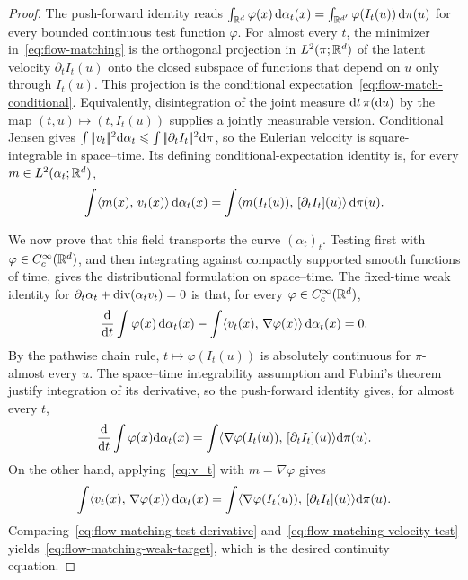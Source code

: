 \begin{proof}
	The push-forward identity reads \(\int_{\mathbb{R}^d}\varphi(x)\,\mathrm{d}\alpha_t(x)=\int_{\mathbb{R}^{d'}}\varphi(I_t(u))\,\mathrm{d}\pi(u)\) for every bounded continuous test function $\varphi$.
	For almost every $t$, the minimizer in~\eqref{eq:flow-matching} is the orthogonal projection in $L^2(\pi;\mathbb{R}^d)$ of the latent velocity $\partial_t I_t(u)$ onto the closed subspace of functions that depend on $u$ only through $I_t(u)$. This projection is the conditional expectation~\eqref{eq:flow-match-conditional}. Equivalently, disintegration of the joint measure \(\mathrm{d} t\,\pi(\mathrm{d} u)\) by the map \((t,u)\mapsto(t,I_t(u))\) supplies a jointly measurable version. Conditional Jensen gives \(\int|\!| v_t |\!|^2\mathrm{d}\alpha_t\leqslant\int|\!| \partial_t I_t |\!|^2\mathrm{d}\pi\),
	so the Eulerian velocity is square-integrable in space--time. Its defining conditional-expectation identity is, for every \(m\in L^2(\alpha_t;\mathbb{R}^d)\),
	\begin{equation}\label{eq:v_t}
		\int \langle m(x),\,v_t(x)\rangle \, \mathrm{d}\alpha_t(x)
		=
		\int \langle m(I_t(u)),\,[\partial_t I_t](u)\rangle \, \mathrm{d}\pi(u).
	\end{equation}

	We now prove that this field transports the curve $(\alpha_t)_t$. Testing first with \(\varphi\in C_c^\infty(\mathbb{R}^d)\), and then integrating against compactly supported smooth functions of time, gives the distributional formulation on space--time. The fixed-time weak identity for
	$\partial_t\alpha_t+\operatorname{div}(\alpha_t v_t)=0$ is that, for every $\varphi\in C_c^\infty(\mathbb{R}^d)$,
	\begin{equation}\label{eq:flow-matching-weak-target}
		\frac{\mathrm{d}}{\mathrm{d} t}\int\varphi(x)\,\mathrm{d}\alpha_t(x)
		-
		\int\langle v_t(x),\,\nabla\varphi(x)\rangle\,\mathrm{d}\alpha_t(x)
		=0.
	\end{equation}
	By the pathwise chain rule, $t\mapsto\varphi(I_t(u))$ is absolutely continuous for $\pi$-almost every $u$. The space--time integrability assumption and Fubini's theorem justify integration of its derivative, so the push-forward identity gives, for almost every $t$,
	\begin{equation}\label{eq:flow-matching-test-derivative}
		\frac{\mathrm{d}}{\mathrm{d} t}\int \varphi(x)\mathrm{d}\alpha_t(x)
		=
		\int \langle \nabla\varphi(I_t(u)),\,[\partial_t I_t](u)\rangle\mathrm{d}\pi(u).
	\end{equation}
	On the other hand, applying~\eqref{eq:v_t} with $m=\nabla\varphi$ gives
	\begin{equation}\label{eq:flow-matching-velocity-test}
		\int\langle v_t(x),\,\nabla\varphi(x)\rangle\,\mathrm{d}\alpha_t(x)
		=
		\int \langle \nabla\varphi(I_t(u)),\,[\partial_t I_t](u)\rangle\mathrm{d}\pi(u).
	\end{equation}
	Comparing~\eqref{eq:flow-matching-test-derivative} and~\eqref{eq:flow-matching-velocity-test} yields~\eqref{eq:flow-matching-weak-target}, which is the desired continuity equation.
\end{proof}


